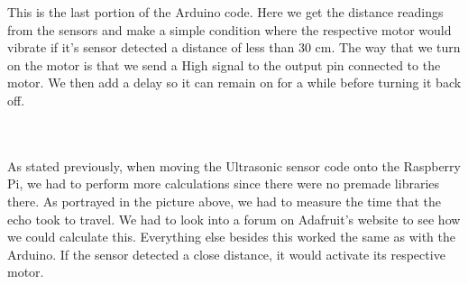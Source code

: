 \documentclass[letterpaper,12pt]{article}
\begin{document}
This is the last portion of the Arduino code. Here we get the distance readings from the sensors and make a simple condition where the respective motor would vibrate if it's sensor detected a distance of less than 30 cm. The way that we turn on the motor is that we send a High signal to the output pin connected to the motor. We then add a delay so it can remain on for a while before turning it back off. \par \ \\

\\

As stated previously, when moving the Ultrasonic sensor code onto the Raspberry Pi, we had to perform more calculations since there were no premade libraries there. As portrayed in the picture above, we had to measure the time that the echo took to travel. We had to look into a forum on Adafruit's website to see how we could calculate this. Everything else besides this worked the same as with the Arduino. If the sensor detected a close distance, it would activate its respective motor.
\end{document}
